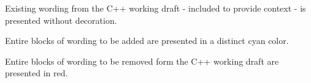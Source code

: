 Existing wording from the C++ working draft - included to provide context - is
presented without decoration.

\begin{addedblock}
Entire blocks of wording to be added are presented in a distinct cyan color.
\end{addedblock}



\begin{removedblock}
Entire blocks of wording to be removed form the C++ working draft are presented 
in red.
\end{removedblock}

